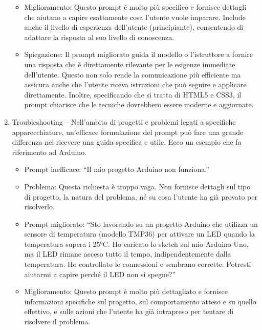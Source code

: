 \begin{enumerate}
\begin{itemize}
                    \item Miglioramento: Questo prompt è molto più specifico e fornisce dettagli che aiutano a capire esattamente cosa l'utente vuole imparare. Include anche il livello di esperienza dell'utente (principiante), consentendo di adattare la risposta al suo livello di conoscenza.
                    
                    \item Spiegazione: Il prompt migliorato guida il modello o l'istruttore a fornire una risposta che è direttamente rilevante per le esigenze immediate dell'utente. Questo non solo rende la comunicazione più efficiente ma assicura anche che l'utente riceva istruzioni che può seguire e applicare direttamente. Inoltre, specificando che si tratta di HTML5 e CSS3, il prompt chiarisce che le tecniche dovrebbero essere moderne e aggiornate.
                \end{itemize}

                \item Troubleshooting -- Nell'ambito di progetti e problemi legati a specifiche apparecchiature, un'efficace formulazione del prompt può fare una grande differenza nel ricevere una guida specifica e utile. Ecco un esempio che fa riferimento ad Arduino.
                \begin{itemize}
                    \item Prompt inefficace: ``Il mio progetto Arduino non funziona.''
                    
                    \item Problema: Questa richiesta è troppo vaga. Non fornisce dettagli sul tipo di progetto, la natura del problema, né su cosa l'utente ha già provato per risolverlo.
                   
                    \item Prompt migliorato: ``Sto lavorando su un progetto Arduino che utilizza un sensore di temperatura (modello TMP36) per attivare un LED quando la temperatura supera i 25°C. Ho caricato lo sketch sul mio Arduino Uno, ma il LED rimane acceso tutto il tempo, indipendentemente dalla temperatura. Ho controllato le connessioni e sembrano corrette. Potresti aiutarmi a capire perché il LED non si spegne?''
                    
                    \item Miglioramento: Questo prompt è molto più dettagliato e fornisce informazioni specifiche sul progetto, sul comportamento atteso e su quello effettivo, e sulle azioni che l'utente ha già intrapreso per tentare di risolvere il problema.
                    

\end{itemize}
\end{enumerate}
